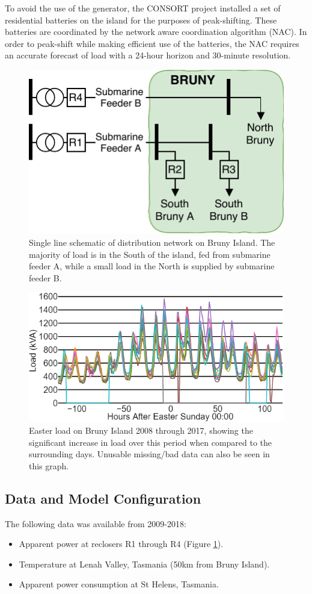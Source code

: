 \documentclass[conference]{IEEEtran}
\begin{document}
To avoid the use of the generator, the CONSORT project installed a set of residential batteries on the island for the purposes of peak-shifting.
These batteries are coordinated by the network aware coordination algorithm (NAC).
In order to peak-shift while making efficient use of the batteries, the NAC requires an accurate forecast of load with a 24-hour horizon and 30-minute resolution.

\begin{figure}[htbp]
	\centerline{\includegraphics[width=.25\textwidth]{images/bruny_single_line.pdf}}
	\caption{Single line schematic of distribution network on Bruny Island.
			 The majority of load is in the South of the island, fed from submarine feeder A, while a small load in the North is supplied by submarine feeder B.}
	\label{fig:bruny_network}
\end{figure}

\begin{figure}[htbp]
	\centerline{\includegraphics[width=.40\textwidth]{images/easter_bruny.png}}
	\caption{Easter load on Bruny Island 2008 through 2017, showing the significant increase in load over this period when compared to the surrounding days. 
     	     Unusable missing/bad data can also be seen in this graph.}
	\label{fig:bruny_easter}
\end{figure}

\subsection{Data and  Model Configuration}
The following data was available from 2009-2018:
\begin{itemize}
	\item Apparent power at reclosers R1 through R4 (Figure \ref{fig:bruny_network}).
	\item Temperature at Lenah Valley, Tasmania (50km from Bruny Island). 
	\item Apparent power consumption at St Helens, Tasmania.
\end{itemize}
\end{document}
